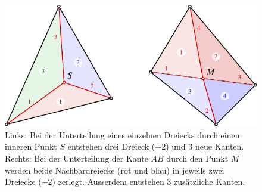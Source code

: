 %
%
%
\begin{figure}
\centering
\includegraphics{chapters/120-topologie/images/unterteilung.pdf}
\caption{Links: Bei der Unterteilung eines einzelnen Dreiecks durch einen
inneren Punkt $S$ entstehen drei Dreieck ($+2$) und 3 neue Kanten.
Rechts: Bei der Unterteilung der Kante $AB$ durch den Punkt $M$ werden
beide Nachbardreiecke (rot und blau) in jeweils zwei Dreiecke ($+2)$ zerlegt.
Ausserdem entstehen 3 zusätzliche Kanten.
\label{buch:topologie:eulercharakteristik:fig:unterteilung}}
\end{figure}
